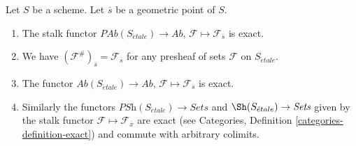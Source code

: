 \begin{lemma}
\label{lemma-stalk-exact}
Let $S$ be a scheme. Let $\overline{s}$ be a geometric point of $S$.
\begin{enumerate}
\item The stalk functor
$\textit{PAb}(S_{\acute{e}tale}) \to \textit{Ab}$,
$\mathcal{F}  \mapsto  \mathcal{F}_{\overline{s}}$
is exact.
\item We have $(\mathcal{F}^\#)_{\overline{s}} = \mathcal{F}_{\overline{s}}$
for any presheaf of sets $\mathcal{F}$ on $S_{\acute{e}tale}$.
\item The functor
$\textit{Ab}(S_{\acute{e}tale}) \to \textit{Ab}$,
$\mathcal{F} \mapsto \mathcal{F}_{\overline{s}}$ is exact.
\item Similarly the functors
$\textit{PSh}(S_{\acute{e}tale}) \to \textit{Sets}$ and
$\Sh(S_{\acute{e}tale}) \to \textit{Sets}$ given by the stalk functor
$\mathcal{F} \mapsto \mathcal{F}_{\overline{x}}$ are exact (see
Categories, Definition \ref{categories-definition-exact})
and commute with arbitrary colimits.
\end{enumerate}
\end{lemma}

